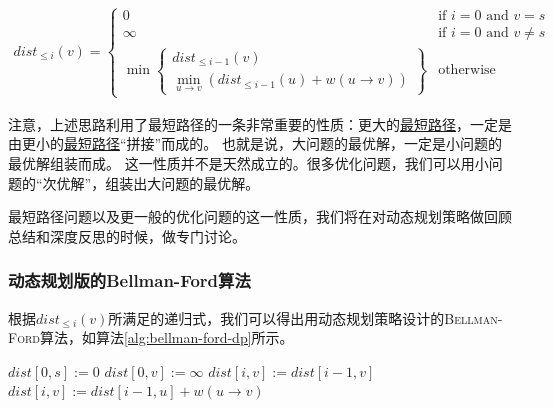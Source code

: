 \begin{align}
    dist_{\leq i}(v) = \begin{cases}
        0 & \text{if }  i=0 \text{ and } v=s\\
        \infty & \text{if }  i=0 \text{ and } v\neq s\\
        \min \left\lbrace 
        \begin{gathered}
            dist_{\leq i-1} (v) \\
            \min_{u\rightarrow v} (dist_{\leq i-1}(u) + w(u\rightarrow v))
        \end{gathered}    
        \right\rbrace &\text{otherwise}
    \end{cases}
\end{align}

注意，上述思路利用了最短路径的一条非常重要的性质：更大的\ul{最短路径}，一定是由更小的\ul{最短路径}“拼接”而成的。
也就是说，大问题的最优解，一定是小问题的最优解组装而成。
这一性质并不是天然成立的。很多优化问题，我们可以用小问题的“次优解”，组装出大问题的最优解。

最短路径问题以及更一般的优化问题的这一性质，我们将在对动态规划策略做回顾总结和深度反思的时候，做专门讨论。

\subsubsection{动态规划版的Bellman-Ford算法}

根据$dist_{\leq i}(v)$所满足的递归式，我们可以得出用动态规划策略设计的\textsc{Bellman-Ford}算法，如算法\ref{alg:bellman-ford-dp}所示。

\begin{algorithm}[htbp]
    \caption{($s$)}
    \label{alg:bellman-ford-dp}
    \begin{algorithmic}[1]
        \State $dist[0, s] := 0$
            \State $dist[0, v] := \infty$
        \EndFor
                \State $dist[i,v] := dist[i-1, v]$
                        \State $dist[i,v] := dist[i-1, u] + w(u\rightarrow v)$
                    \EndIf
                \EndFor
            \EndFor
        \EndFor
    \end{algorithmic}
\end{algorithm}



